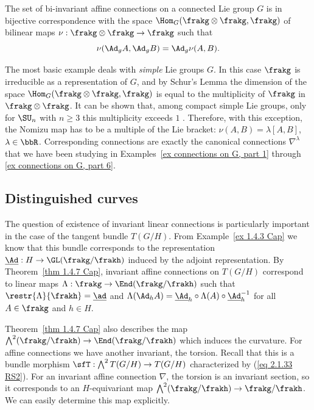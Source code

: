 \begin{cor}
    The set of bi-invariant affine connections on a connected Lie group $G$ is in bijective correspondence with the space $\Hom_G(\frakg\otimes\frakg,\frakg)$ of bilinear maps $\nu:\frakg\otimes\frakg\to \frakg$ such that 
    \[\nu(\Ad_g A,\Ad_g B)=\Ad_g \nu(A,B).\]
\end{cor}

The most basic example deals with \emph{simple} Lie groups $G$. In this case $\frakg$ is irreducible as a representation of $G$, and by Schur's Lemma the dimension of the space $\Hom_G(\frakg\otimes\frakg,\frakg)$ is equal to the multiplicity of $\frakg$ in $\frakg\otimes\frakg$. It can be shown that, among compact simple Lie groups, only for $\SU_n$ with $n\geq 3$ this multiplicity exceeds $1$ \cite{Laquer}. Therefore, with this exception, the Nomizu map has to be a multiple of the Lie bracket: $\nu(A,B)=\lambda[A,B]$, $\lambda\in\bbR$. Corresponding connections are exactly the canonical connections $\nabla^\lambda$ that we have been studying in Examples~\ref{ex connections on G, part 1} through \ref{ex connections on G, part 6}.







\subsection{Distinguished curves}


The question of existence of invariant linear connections is particularly important in the case of the tangent bundle $T(G\slash H)$. From Example~\ref{ex 1.4.3 Cap} we know that this bundle corresponds to the representation $\underline{\Ad}:H\to \GL(\frakg\slash\frakh)$ induced by the adjoint representation. By Theorem~\ref{thm 1.4.7 Cap}, invariant affine connections on $T(G\slash H)$ correspond to linear maps $\Lambda:\frakg\to \End(\frakg\slash\frakh)$ such that $\restr{\Lambda}{\frakh}=\underline{\ad}$ and $\Lambda(\Ad_h A)=\underline{\Ad}_h\circ\Lambda(A)\circ \underline{\Ad}_h^{-1}$ for all $A\in\frakg$ and $h\in H$.

Theorem~\ref{thm 1.4.7 Cap} also describes the map $\bigwedge^2(\frakg\slash\frakh)\to \End(\frakg\slash\frakh)$ which induces the curvature. For affine connections we have another invariant, the torsion. Recall that this is a bundle morphism $\sfT:\bigwedge^2 T(G\slash H)\to T(G\slash H)$ characterized by (\ref{eq 2.1.33 RS2}). For an invariant affine connection $\nabla$, the torsion is an invariant section, so it corresponds to an $H$-equivariant map $\bigwedge^2(\frakg\slash\frakh)\to \frakg\slash\frakh$. We can easily determine this map explicitly.

